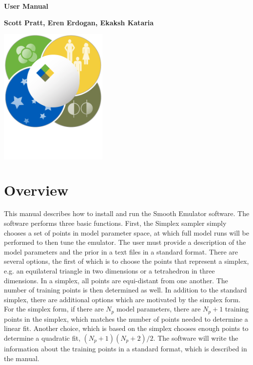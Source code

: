 \documentclass[12pt]{article}
\numberwithin{equation}{section}
\numberwithin{figure}{section}
\begin{document}
\begin{titlepage}
   \begin{center}
       \vspace*{1cm}

       \textbf{User Manual}

       \vspace{2.0cm}

       \textbf{Scott Pratt, Eren Erdogan, Ekaksh Kataria}
       
       \vfill
            
       \vspace{0.8cm}
     
       \includegraphics[width=0.4\textwidth]{FRIB_logo.png}
            
            
   \end{center}
\end{titlepage}
\tableofcontents

\newpage


\section{Overview}



This manual describes how to install and run the Smooth Emulator software. The software performs three basic functions. First, the Simplex sampler simply chooses a set of points in model parameter space, at which full model runs will be performed to then tune the emulator. The user must provide a description of the model parameters and the prior in a text files in a standard format. There are several options, the first of which is to choose the points that represent a simplex, e.g. an equilateral triangle in two dimensions or a tetrahedron in three dimensions. In a simplex, all points are equi-distant from one another.  The number of training points is then determined as well. In addition to the standard simplex, there are additional options which are motivated by the simplex form. For the simplex form, if there are $N_p$ model parameters, there are $N_p+1$ training points in the simplex, which matches the number of points needed to determine a linear fit. Another choice, which is based on the simplex chooses enough points to determine a quadratic fit, $(N_p+1)(N_p+2)/2$. The software will write the information about the training points in a standard format, which is described in the manual.
\end{document}
